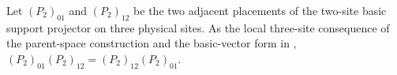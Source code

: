 \begin{lemma}
    \label{thm:appendixB_two_site_basic_support_projectors_commute}
    \leanok
    Let $(P_2)_{01}$ and $(P_2)_{12}$ be the two adjacent placements of the
    two-site basic support projector on three physical sites. As the local
    three-site consequence of the parent-space construction and the
    basic-vector form in \cite[Definition~3.9, Equations~(3.16)--(3.18), and
        Appendix~B]{Cirac2016MPDO_arXiv},
    $(P_2)_{01}(P_2)_{12} =(P_2)_{12}(P_2)_{01}$.
\end{lemma}

